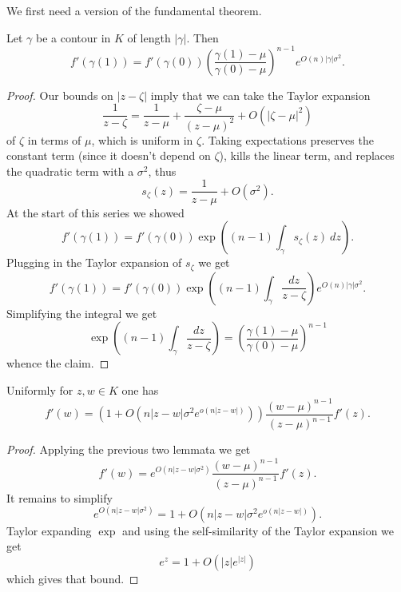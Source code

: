 \documentclass[12pt]{article}
\begin{document}
We first need a version of the fundamental theorem.

\begin{lemma}
Let $\gamma$ be a contour in $K$ of length $|\gamma|$. Then
$$f'(\gamma(1)) = f'(\gamma(0)) \left(\frac{\gamma(1) - \mu}{\gamma(0) - \mu}\right)^{n - 1} e^{O(n) |\gamma| \sigma^2}.$$
\end{lemma}
\begin{proof}
Our bounds on $|z - \zeta|$ imply that we can take the Taylor expansion
$$\frac{1}{z - \zeta} = \frac{1}{z - \mu} + \frac{\zeta - \mu}{(z - \mu)^2} + O(|\zeta - \mu|^2)$$
of $\zeta$ in terms of $\mu$, which is uniform in $\zeta$.
Taking expectations preserves the constant term (since it doesn't depend on $\zeta$), kills the linear term, and replaces the quadratic term with a $\sigma^2$, thus
$$s_\zeta(z) = \frac{1}{z - \mu} + O(\sigma^2).$$
At the start of this series we showed
$$f'(\gamma(1)) = f'(\gamma(0)) \exp\left((n-1)\int_\gamma s_\zeta(z) ~dz\right).$$
Plugging in the Taylor expansion of $s_\zeta$ we get
$$f'(\gamma(1)) = f'(\gamma(0)) \exp\left((n-1)\int_\gamma \frac{dz}{z - \zeta}\right) e^{O(n) |\gamma| \sigma^2}.$$
Simplifying the integral we get
$$\exp\left((n-1)\int_\gamma \frac{dz}{z - \zeta}\right) = \left(\frac{\gamma(1) - \mu}{\gamma(0) - \mu}\right)^{n - 1}$$
whence the claim.
\end{proof}

\begin{lemma}
Uniformly for $z,w \in K$ one has
$$f'(w) = (1 + O(n|z - w|\sigma^2 e^{o(n|z - w|)})) \frac{(w - \mu)^{n-1}}{(z - \mu)^{n - 1}}f'(z).$$
\end{lemma}
\begin{proof}
Applying the previous two lemmata we get
$$f'(w) = e^{O(n|z - w|\sigma^2)} \frac{(w - \mu)^{n-1}}{(z - \mu)^{n - 1}}f'(z).$$
It remains to simplify
$$e^{O(n|z - w|\sigma^2)} = 1 + O(n|z - w|\sigma^2 e^{o(n|z - w|)}).$$
Taylor expanding $\exp$ and using the self-similarity of the Taylor expansion we get
$$e^z = 1 + O(|z| e^{|z|})$$
which gives that bound.
\end{proof}
\end{document}
